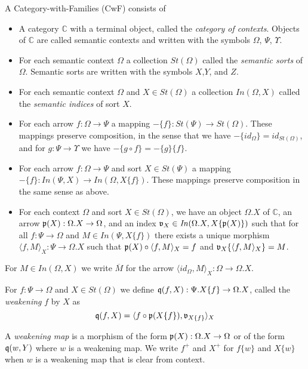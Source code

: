 \documentclass[sigplan,10pt,review,anonymous]{acmart}
\begin{document}
A Category-with-Families (CwF) consists of 
\begin{itemize}
\item A category $\mathbb C$ with a terminal object, called the \emph{category of contexts}. Objects of $\mathbb C$ are called semantic contexts and written with the symbols $\Omega$, $\Psi$, $\Upsilon$.
\item For each semantic context $\Omega$ a collection $\mathit{St}(\Omega)$ called the \emph{semantic sorts} of $\Omega$. Semantic sorts are written with the symbols $X$,$Y$, and $Z$.
\item For each semantic context $\Omega$ and $X \in \mathit{St}(\Omega)$ a collection $\mathit{In}(\Omega,X)$ called the \emph{semantic indices} of sort $X$.
\item For each arrow $f : \Omega \to \Psi$ a mapping $- \{ f \} : \mathit{St}(\Psi) \to \mathit{St}(\Omega)$. These mappings preserve composition, in the sense that we have $- \{ \mathit{id}_{\Omega} \} = \mathit{id}_{\mathit{St}(\Omega)}$, and for $g : \Psi \to \Upsilon$ we have $- \{ g \circ f \} = - \{ g \} \{ f \}$.
\item For each arrow $f : \Omega \to \Psi$ and sort $X \in \mathit{St}(\Psi)$ a mapping $- \{ f \} : \mathit{In}(\Psi,X) \to \mathit{In}(\Omega,X \{ f \})$. These mappings preserve composition in the same sense as above.
\item For each context $\Omega$ and sort $X \in \mathit{St}(\Omega)$, we have an object $\Omega . X$ of $\mathbb C$, an arrow $\frak p(X) : \Omega . X \to \Omega$, and an index $\frak v_{X} \in \mathit{In}(\Omega . X, X \{ \frak p(X) \})$ such that for all $f : \Psi \to \Omega$ and $M \in \mathit{In}(\Psi, X \{ f \})$ there exists a unique morphism $\langle f , M \rangle_X : \Psi \to \Omega . X$ such that $\frak p(X) \circ \langle f , M \rangle_X = f$ and $\frak v_{X} \{ \langle f, M \rangle_X \} = M$.
\end{itemize}

For $M \in \mathit{In}(\Omega, X)$ we write $\overline{M}$ for the arrow $\langle \mathit{id}_{\Omega}, M \rangle_X : \Omega \to \Omega.X$. 

For $f : \Psi \to \Omega$ and $X \in \mathit{St}(\Omega)$ we define $\frak q(f, X) : \Psi.X \{ f \} \to \Omega . X$, called the \emph{weakening} $f$ by $X$ as
$$\frak q(f,X) = \langle f \circ \frak p(X \{ f \}), \frak v_{X \{ f \}} \rangle_X$$

A \emph{weakening map} is a morphism of the form $\frak p(X) : \Omega . X \to \Omega$ or of the form $\frak q(w, Y)$ where $w$ is a weakening map. We write $f^+$ and $X^+$ for $f \{ w \}$ and $X \{ w \}$ when $w$ is a weakening map that is clear from context.
\end{document}
